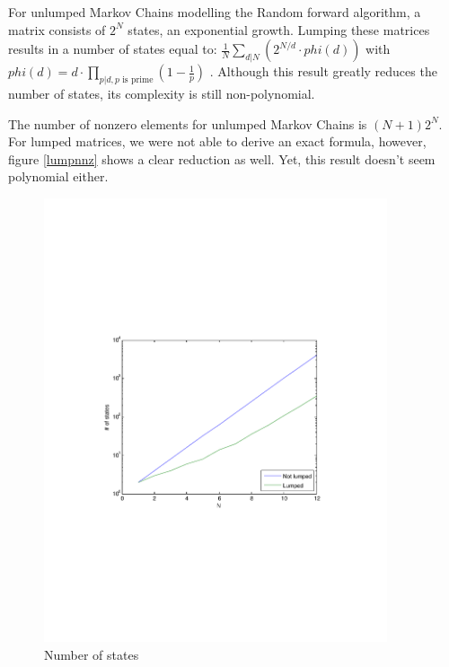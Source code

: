 \documentclass[10pt,a4paper]{article}
\begin{document}
For unlumped Markov Chains modelling the Random forward algorithm, a matrix consists of $2^N$ states, an exponential growth. Lumping these matrices results in a number of states equal to:  $\frac{1}{N} \sum_{d|N} (2^{N/d} \cdot phi(d) )$ with $phi(d) = d \cdot \prod_{p|d, p\text{ is prime}} (1-\frac{1}{p})$ \cite{A000031}. Although this result greatly reduces the number of states, its complexity is still non-polynomial.

The number of nonzero elements for unlumped Markov Chains is $(N+1) 2^N$. For lumped matrices, we were not able to derive an exact formula, however, figure \ref{lumpnnz} shows a clear reduction as well. Yet, this result doesn't seem polynomial either.

\begin{figure}[h!tb]
\centering
\includegraphics[clip=true, trim=9em 24em 9em 24em, width=0.9\textwidth]{resources/plotlumping.pdf}
\caption{Number of states}
\label{figlump}
\end{figure}
\end{document}
